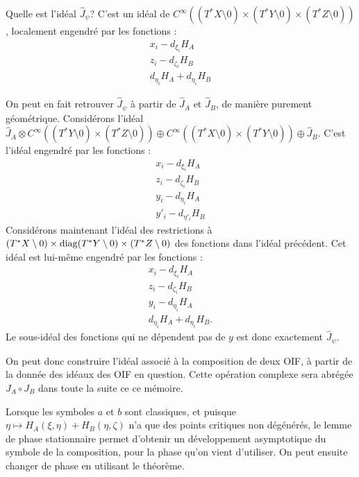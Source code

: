 Quelle est l'idéal $\hat{J}_{\psi}$? C'est un idéal de $C^{\infty}((T^*X \setminus 0)\times (T^*Y \setminus 0)\times (T^*Z \setminus 0) )$, localement engendré par les fonctions :
\begin{align*}
	x_i-d_{\xi_i}H_A\\
	z_i-d_{\zeta_i}H_B\\
	d_{\eta_i}H_A+d_{\eta_i}H_B
\end{align*}

On peut en fait retrouver $\hat{J}_{\psi}$ à partir de $\hat{J}_A$ et $\hat{J}_B$, de manière purement géométrique. Considérons l'idéal $\hat{J}_A \otimes C^{\infty}((T^*Y\setminus 0)\times (T^*Z\setminus 0)) \oplus C^{\infty}((T^*X\setminus 0)\times (T^*Y\setminus 0)) \oplus \hat{J}_B$. C'est l'idéal engendré par les fonctions :
\begin{align*}
	x_i-d_{\xi_i}H_A\\
	z_i-d_{\zeta_i}H_B\\
	y_i-d_{\eta_i}H_A\\
	y'_i - d_{\eta'_i}H_B
\end{align*}
Considérons maintenant l'idéal des restrictions à $(T^*X\setminus 0)\times \operatorname{diag} (T^*Y\setminus 0) \times (T^*Z\setminus 0)$ des fonctions dans l'idéal précédent. Cet idéal est lui-même engendré par les fonctions :
\begin{align*}
x_i-d_{\xi_i}H_A\\
z_i-d_{\zeta_i}H_B\\
y_i-d_{\eta_i}H_A\\
d_{\eta_i}H_A+ d_{\eta_i}H_B.
\end{align*}
Le sous-idéal des fonctions qui ne dépendent pas de $y$ est donc exactement $\hat{J}_{\psi}$.

On peut donc construire l'idéal associé à la composition de deux OIF, à partir de la donnée des idéaux des OIF en question. Cette opération complexe sera abrégée $J_A\circ J_B$ dans toute la suite ce ce mémoire.

\begin{rem}
	Lorsque les symboles $a$ et $b$ sont classiques, et puisque $\eta \mapsto H_A(\xi,\eta)+H_B(\eta,\zeta)$ n'a que des points critiques non dégénérés, le lemme de phase stationnaire permet d'obtenir un développement asymptotique du symbole de la composition, pour la phase qu'on vient d'utiliser. On peut ensuite changer de phase en utilisant le théorème.
\end{rem}

